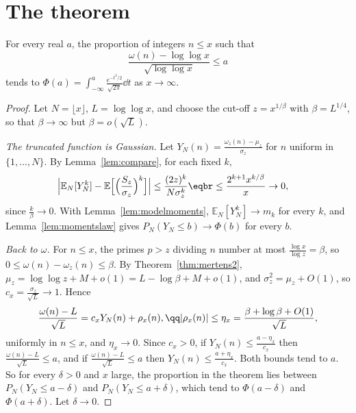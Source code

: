 \section{The theorem}

\begin{theorem}\label{thm:erdoskac}
For every real $a$, the proportion of integers $n\le x$ such that
\[
\frac{\omega(n)-\log\log x}{\sqrt{\log\log x}}\le a
\]
tends to $\Phi(a)=\int_{-\infty}^a\frac{e^{-t^2/2}}{\sqrt{2\pi}}\dd t$ as $x\to\infty$.
\end{theorem}
\begin{proof}
Let $N=\lfloor x\rfloor$, $L=\log\log x$, and choose the cut-off $z=x^{1/\beta}$ with $\beta=L^{1/4}$, so that $\beta\to\infty$ but $\beta=o(\sqrt L)$.

\emph{The truncated function is Gaussian.} Let $Y_N(n)=\frac{\omega_z(n)-\mu_z}{\sigma_z}$ for $n$ uniform in $\{1,\dots,N\}$. By Lemma~\ref{lem:compare}, for each fixed $k$,
\[
\begin{aligned}\Bigl|\mathbb E_N[Y_N^k]-\mathbb E\Bigl[\Bigl(\frac{S_z}{\sigma_z}\Bigr)^k\Bigr]\Bigr|&\le\frac{(2z)^k}{N\sigma_z^k}\eqbr\le\frac{2^{k+1}x^{k/\beta}}x\to0,\end{aligned}
\]
since $\frac k\beta\to0$. With Lemma~\ref{lem:modelmoments}, $\mathbb E_N[Y_N^k]\to m_k$ for every $k$, and Lemma~\ref{lem:momentslaw} gives $P_N(Y_N\le b)\to\Phi(b)$ for every $b$.

\emph{Back to $\omega$.} For $n\le x$, the primes $p>z$ dividing $n$ number at most $\frac{\log x}{\log z}=\beta$, so $0\le\omega(n)-\omega_z(n)\le\beta$. By Theorem~\ref{thm:mertens2}, $\mu_z=\log\log z+M+o(1)=L-\log\beta+M+o(1)$, and
$\sigma_z^2=\mu_z+O(1)$, so $c_x=\frac{\sigma_z}{\sqrt L}\to1$. Hence
\[
\begin{gathered}\frac{\omega(n)-L}{\sqrt L}=c_xY_N(n)+\rho_x(n),\qq|\rho_x(n)|\le\eta_x=\frac{\beta+\log\beta+O(1)}{\sqrt L},\end{gathered}
\]
uniformly in $n\le x$, and $\eta_x\to0$. Since $c_x>0$, if $Y_N(n)\le\frac{a-\eta_x}{c_x}$ then $\frac{\omega(n)-L}{\sqrt L}\le a$, and if $\frac{\omega(n)-L}{\sqrt L}\le a$ then $Y_N(n)\le\frac{a+\eta_x}{c_x}$. Both bounds tend to $a$. So for every $\delta>0$
and $x$ large, the proportion in the theorem lies between $P_N(Y_N\le a-\delta)$ and $P_N(Y_N\le a+\delta)$, which tend to $\Phi(a-\delta)$ and $\Phi(a+\delta)$. Let $\delta\to0$.
\end{proof}

